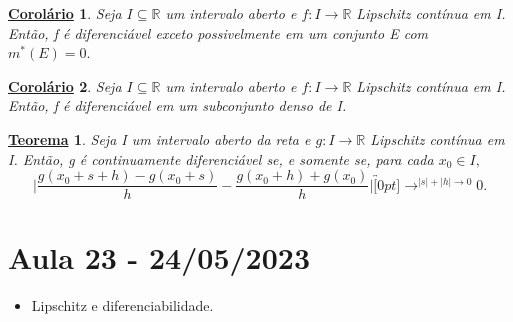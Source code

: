 \documentclass{article}
\newtheorem*{theorem*}{\underline{Teorema}}
\newtheorem*{crl*}{\underline{Corol\'ario}}
\begin{document}
 \begin{crl*}
   Seja \(I\subseteq{\mathbb{R}}\) um intervalo aberto e \(f:I\rightarrow \mathbb{R}\) Lipschitz contínua em I.
  Então, f é diferenciável exceto possivelmente em um conjunto E com \(m^{*}(E) = 0.\)
 \end{crl*}
\begin{crl*}
  Seja \(I\subseteq{\mathbb{R}}\) um intervalo aberto e \(f:I\rightarrow \mathbb{R}\) Lipschitz contínua em I. Então, f é diferenciável em um
  subconjunto denso de I.
\end{crl*}
 \begin{theorem*}
   Seja I um intervalo aberto da reta e \(g:I\rightarrow \mathbb{R}\) Lipschitz contínua
   em I. Então, g é continuamente diferenciável se, e somente se, para cada \(x_{0}\in I,\) 
     \[
       \biggl|\frac{g(x_{0}+s+h)-g(x_{0}+s)}{h}-\frac{g(x_{0}+h)+g(x_{0})}{h}\biggr|\overbracket[0pt]{\longrightarrow}^{|s|+|h|\to 0}0.
     \]
 \end{theorem*}
\newpage

\section{Aula 23 - 24/05/2023}
\begin{itemize}
  \item Lipschitz e diferenciabilidade.
\end{itemize}
\end{document}
